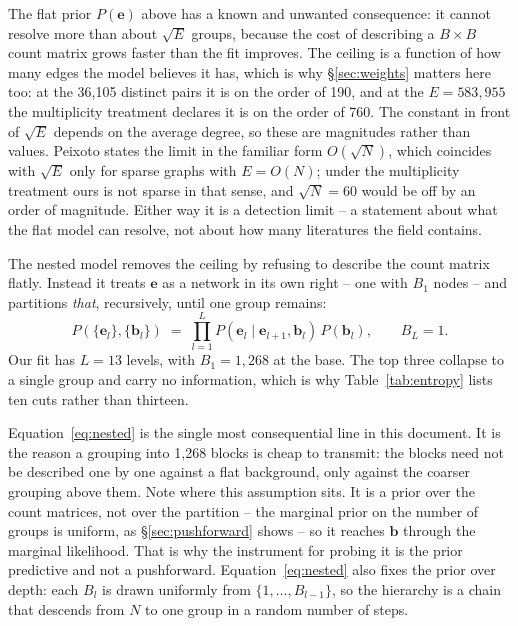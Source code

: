 \documentclass[11pt]{article}
\begin{document}
The flat prior $P(\bm{e})$ above has a known and unwanted consequence: it
cannot resolve more than about $\sqrt{E}$ groups, because the cost of
describing a $B \times B$ count matrix grows faster than the fit improves.
The ceiling is a function of how many edges the model believes it has, which
is why \S\ref{sec:weights} matters here too: at the 36{,}105 distinct pairs
it is on the order of 190, and at the $E = 583{,}955$ the multiplicity
treatment declares it is on the order of 760. The constant in front of
$\sqrt{E}$ depends on the average degree, so these are magnitudes rather than
values. Peixoto states the limit in the familiar form $O(\sqrt{N})$, which
coincides with $\sqrt{E}$ only for sparse graphs with $E = O(N)$; under the
multiplicity treatment ours is not sparse in that sense, and $\sqrt{N} = 60$
would be off by an order of magnitude. Either way it is a detection limit
-- a statement about what
the flat model can resolve, not about how many literatures the field
contains.

The nested model removes the ceiling by refusing to describe the count matrix
flatly. Instead it treats $\bm{e}$ as a network in its own right -- one with
$B_1$ nodes -- and partitions \emph{that}, recursively, until one group remains:
\begin{equation}
P(\{\bm{e}_l\}, \{\bm{b}_l\}) \;=\;
  \prod_{l=1}^{L} P(\bm{e}_l \mid \bm{e}_{l+1}, \bm{b}_{l})\,P(\bm{b}_{l}),
  \qquad B_L = 1 .
\label{eq:nested}
\end{equation}
Our fit has $L = 13$ levels, with $B_1 = 1{,}268$ at the base. The top three
collapse to a single group and carry no information, which is why
Table~\ref{tab:entropy} lists ten cuts rather than thirteen.

Equation~\eqref{eq:nested} is the single most consequential line in this
document. It is the reason a grouping into 1{,}268 blocks is cheap to transmit:
the blocks need not be described one by one against a flat background, only
against the coarser grouping above them. Note where this assumption sits. It
is a prior over the count matrices, not over the partition -- the marginal
prior on the number of groups is uniform, as \S\ref{sec:pushforward} shows --
so it reaches $\bm{b}$ through the marginal likelihood. That is why the
instrument for probing it is the prior predictive and not a pushforward.
Equation~\eqref{eq:nested} also fixes the prior over depth: each $B_l$ is
drawn uniformly from $\{1, \dots, B_{l-1}\}$, so the hierarchy is a chain
that descends from $N$ to one group in a random number of steps.
\end{document}
